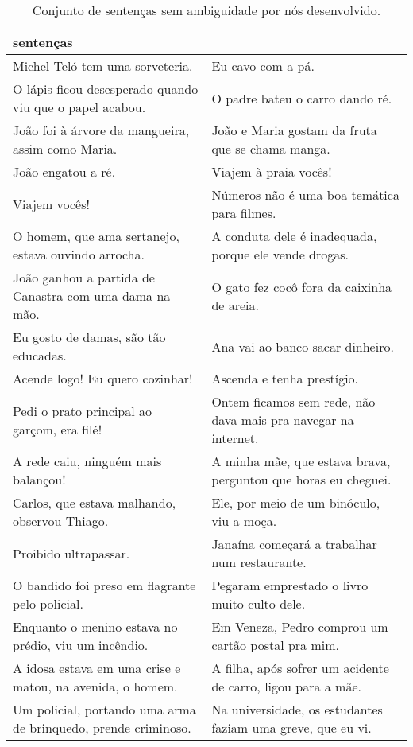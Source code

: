 \setlength\LTleft{-1in}
\setlength\LTright{-1in}
\begin{small}
\renewcommand{\arraystretch}{1.5}
\begin{longtable}{
    >{\raggedright\arraybackslash}p{}
    p{}
    }
\caption{Conjunto de sentenças sem ambiguidade por nós desenvolvido.}
\label{dataset_frases_nao_ambiguas}
\\
\toprule
sentenças & \\
\midrule
Michel Teló tem uma sorveteria. & Eu cavo com a pá. \\
O lápis ficou desesperado quando viu que o papel acabou. & O padre bateu o carro dando ré. \\
João foi à árvore da mangueira, assim como Maria. & João e Maria gostam da fruta que se chama manga. \\
João engatou a ré. & Viajem à praia vocês! \\
Viajem vocês! & Números não é uma boa temática para filmes. \\
O homem, que ama sertanejo, estava ouvindo arrocha. & A conduta dele é inadequada, porque ele vende drogas. \\
João ganhou a partida de Canastra com uma dama na mão. & O gato fez cocô fora da caixinha de areia. \\
Eu gosto de damas, são tão educadas. & Ana vai ao banco sacar dinheiro. \\
Acende logo! Eu quero cozinhar! & Ascenda e tenha prestígio. \\
Pedi o prato principal ao garçom, era filé! & Ontem ficamos sem rede, não dava mais pra navegar na internet. \\
A rede caiu, ninguém mais balançou! & A minha mãe, que estava brava, perguntou que horas eu cheguei. \\
Carlos, que estava malhando, observou Thiago. & Ele, por meio de um binóculo, viu a moça. \\
Proibido ultrapassar. & Janaína começará a trabalhar num restaurante. \\
O bandido foi preso em flagrante pelo policial. & Pegaram emprestado o livro muito culto dele. \\
Enquanto o menino estava no prédio, viu um incêndio. & Em Veneza, Pedro comprou um cartão postal pra mim. \\
A idosa estava em uma crise e matou, na avenida, o homem. & A filha, após sofrer um acidente de carro, ligou para a mãe. \\
Um policial, portando uma arma de brinquedo, prende criminoso. & Na universidade, os estudantes faziam uma greve, que eu vi. \\

\end{longtable}
\end{small}
